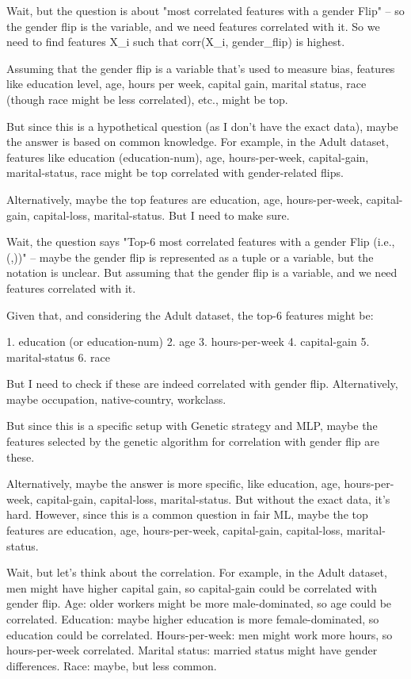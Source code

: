 Wait, but the question is about "most correlated features with a gender Flip" – so the gender flip is the variable, and we need features correlated with it. So we need to find features X_i such that corr(X_i, gender_flip) is highest.

Assuming that the gender flip is a variable that's used to measure bias, features like education level, age, hours per week, capital gain, marital status, race (though race might be less correlated), etc., might be top.

But since this is a hypothetical question (as I don't have the exact data), maybe the answer is based on common knowledge. For example, in the Adult dataset, features like education (education-num), age, hours-per-week, capital-gain, marital-status, race might be top correlated with gender-related flips.

Alternatively, maybe the top features are education, age, hours-per-week, capital-gain, capital-loss, marital-status. But I need to make sure.

Wait, the question says "Top-6 most correlated features with a gender Flip (i.e., (,))" – maybe the gender flip is represented as a tuple or a variable, but the notation is unclear. But assuming that the gender flip is a variable, and we need features correlated with it.

Given that, and considering the Adult dataset, the top-6 features might be:

1. education (or education-num)
2. age
3. hours-per-week
4. capital-gain
5. marital-status
6. race

But I need to check if these are indeed correlated with gender flip. Alternatively, maybe occupation, native-country, workclass.

But since this is a specific setup with Genetic strategy and MLP, maybe the features selected by the genetic algorithm for correlation with gender flip are these.

Alternatively, maybe the answer is more specific, like education, age, hours-per-week, capital-gain, capital-loss, marital-status. But without the exact data, it's hard. However, since this is a common question in fair ML, maybe the top features are education, age, hours-per-week, capital-gain, capital-loss, marital-status.

Wait, but let's think about the correlation. For example, in the Adult dataset, men might have higher capital gain, so capital-gain could be correlated with gender flip. Age: older workers might be more male-dominated, so age could be correlated. Education: maybe higher education is more female-dominated, so education could be correlated. Hours-per-week: men might work more hours, so hours-per-week correlated. Marital status: married status might have gender differences. Race: maybe, but less common.

